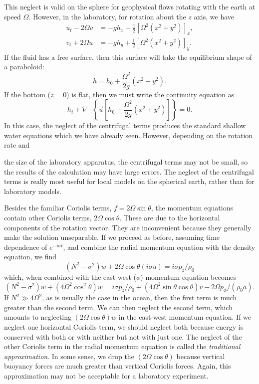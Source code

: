 This neglect is valid on the sphere for geophysical flows rotating with the earth
at speed $\Omega$. However, in the laboratory, for rotation about the $z$ axis, we have
\begin{align*}
	u_t-2\Omega v & =-gh_x+\frac12[\Omega^2(x^2+y^2)]_x, \\
	v_t+2\Omega u & =-gh_y+\frac12[\Omega^2(x^2+y^2)]_y.
\end{align*}
If the fluid has a free surface, then this surface will take the equilibrium shape of a
paraboloid:
\[
	h=h_0+\frac{\Omega^2}{2g}(x^2+y^2).
\]
If the bottom ($z=0$) is flat, then we must write the continuity equation as
\[
	h_t+\nabla\cdot\left\{\vec u\left[h_0+\frac{\Omega^2}{2g}(x^2+y^2)\right]\right\}=0.
\]
In this case, the neglect of the centrifugal terms produces the standard shallow water
equations which we have already seen. However, depending on the rotation rate and

\sourcepagebreak

the size of the laboratory apparatus, the centrifugal terms may not be small, so the
results of the calculation may have large errors. The neglect of the centrifugal terms is
really most useful for local models on the spherical earth, rather than for laboratory
models.

Besides the familiar Coriolis terms, $f=2\Omega\sin\theta$, the momentum equations
contain other Coriolis terms, $2\Omega\cos\theta$. These are due to the horizontal components of
the rotation vector. They are inconvenient because they generally make the solution
unseparable. If we proceed as before, assuming time dependence of $e^{-i\sigma t}$, and combine
the radial momentum equation with the density equation, we find
\[
	(N^2-\sigma^2)w+2\Omega\cos\theta(i\sigma u)=i\sigma p_z/\rho_0
\]
which, when combined with the east-west ($\phi$) momentum equation becomes
\[
	(N^2-\sigma^2)w+(4\Omega^2\cos^2\theta)w
	=i\sigma p_z/\rho_0+(4\Omega^2\sin\theta\cos\theta)v
	-2\Omega p_\phi/(\rho_0a).
\]
If $N^2\gg4\Omega^2$, as is usually the case in the ocean, then the first term is much greater
than the second term. We can then neglect the second term, which amounts to
neglecting $(2\Omega\cos\theta)w$ in the east-west momentum equation. If we neglect one
horizontal Coriolis term, we should neglect both because energy is conserved with both
or with neither but not with just one. The neglect of the other Coriolis term in the
radial momentum equation is called the \emph{traditional approximation}. In some sense, we
drop the $(2\Omega\cos\theta)$ because vertical buoyancy forces are much greater than vertical
Coriolis forces. Again, this approximation may not be acceptable for a laboratory
experiment.

